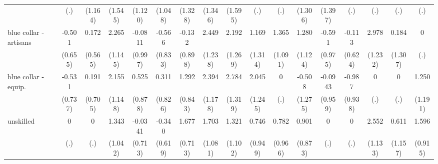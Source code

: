 {\begin{tabular}{l*{16}{c}}
                    &         (.)         &     (1.164)         &     (1.545)         &     (1.120)         &     (1.048)         &     (1.328)         &     (1.346)         &     (1.595)         &         (.)         &         (.)         &     (1.306)         &     (1.397)         &         (.)         &         (.)         &         (.)         &         (.)         \\
[1em]
blue collar - artisans&      -0.501         &       0.172         &       2.265\sym{*}  &     -0.0811         &      -0.566         &      -0.132         &       2.449\sym{*}  &       2.192         &       1.169         &       1.365         &       1.280         &      -0.591         &      -0.113         &       2.978\sym{*}  &       0.184         &           0         \\
                    &     (0.655)         &     (0.565)         &     (1.145)         &     (0.997)         &     (0.833)         &     (0.898)         &     (1.238)         &     (1.269)         &     (1.314)         &     (1.091)         &     (1.124)         &     (0.975)         &     (0.624)         &     (1.232)         &     (1.307)         &         (.)         \\
[1em]
blue collar - equip.&      -0.531         &       0.191         &       2.155         &       0.525         &       0.311         &       1.292         &       2.394\sym{*}  &       2.784\sym{*}  &       2.045         &           0         &      -0.508         &     -0.0943         &      -0.987         &           0         &           0         &       1.250         \\
                    &     (0.737)         &     (0.705)         &     (1.148)         &     (0.878)         &     (0.826)         &     (0.843)         &     (1.178)         &     (1.319)         &     (1.245)         &         (.)         &     (1.275)         &     (0.959)         &     (0.938)         &         (.)         &         (.)         &     (1.191)         \\
[1em]
unskilled           &           0         &           0         &       1.343         &     -0.0341         &      -0.340         &       1.677\sym{*}  &       1.703         &       1.321         &       0.746         &       0.782         &       0.901         &           0         &           0         &       2.552\sym{*}  &       0.611         &       1.596         \\
                    &         (.)         &         (.)         &     (1.042)         &     (0.713)         &     (0.619)         &     (0.713)         &     (1.081)         &     (1.102)         &     (0.949)         &     (0.966)         &     (0.873)         &         (.)         &         (.)         &     (1.133)         &     (1.157)         &     (0.915)         \\

\end{tabular}}

